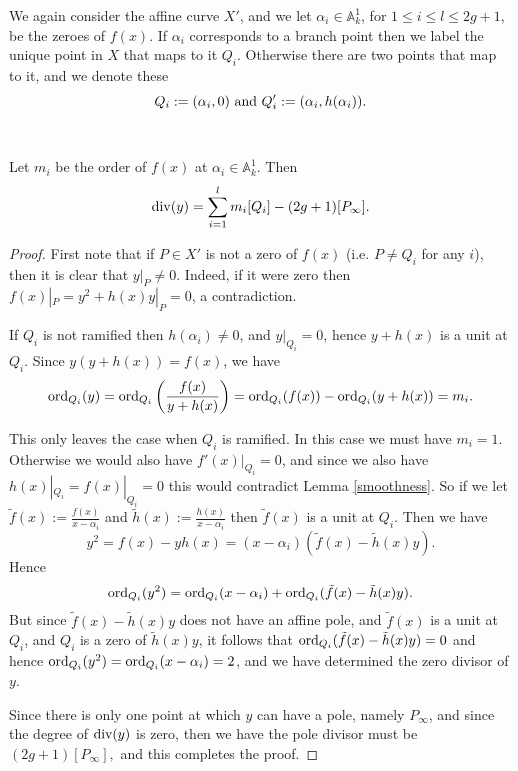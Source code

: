 We again consider the affine curve $X'$, and we let $\alpha_i \in \mathbb A_k^1$, for $1\leq i\leq l \leq 2g+1$, be the zeroes of $f(x)$.
If $\alpha_i$ corresponds to a branch point then we label the unique point in $X$ that maps to it $Q_i$.
Otherwise there are two points that map to it, and we denote these \[ Q_i:=(\alpha_i,0)\ {\rm and}\ Q_i':=(\alpha_i,h(\alpha_i)).\]


~


\begin{lem}\label{ychar2}
 Let $m_i$ be the order of $f(x)$ at $\alpha_i\in \mathbb A_k^1$.
 Then 
 \[
  \operatorname{div}(y) = \sum_{i=1}^l m_i[Q_i] - (2g+1)[P_\infty].
 \]

\end{lem}
\begin{proof}
 First note that if $P\in X'$ is not a zero of $f(x)$ (i.e. $P\neq Q_i$ for any $i$), then it is clear that $y|_P \neq 0$.
 Indeed, if it were zero then $f(x)|_P = y^2 + h(x)y|_P = 0$, a contradiction.
 
 If $Q_i$ is not ramified then $h(\alpha_i) \neq 0$, and $y|_{Q_i} = 0$, hence $y+h(x)$ is a unit at $Q_i$.
 Since $y(y+h(x)) = f(x)$, we have
 \[
  \operatorname{ord}_{Q_i}(y) = \operatorname{ord}_{Q_i}\left(\frac{f(x)}{y+h(x)}\right) = \operatorname{ord}_{Q_i}(f(x)) -\operatorname{ord}_{Q_i}(y+h(x)) = m_i.
 \]

 This only leaves the case when $Q_i$ is ramified. 
 In this case we must have $m_i=1$.
 Otherwise we would also have $f'(x)|_{Q_i} = 0$, and since we also have $h(x)|_{Q_i} = f(x)|_{Q_i} = 0$ this would contradict Lemma \ref{smoothness}.
 So if we let $\tilde f(x) := \frac{f(x)}{x-\alpha_i}$ and $\tilde h(x) := \frac{h(x)}{x-\alpha_i}$ then $\tilde f(x)$ is a unit at $Q_i$.
 Then we have \[y^2 = f(x) - yh(x) = (x-\alpha_i)(\tilde f(x) - \tilde h(x)y).\]
 Hence
 \[
  \operatorname{ord}_{Q_i}(y^2) = \operatorname{ord}_{Q_i}(x-\alpha_i) + \operatorname{ord}_{Q_i}(\tilde f(x) - \tilde h(x)y).
 \]
But since $\tilde f(x) - \tilde h(x) y$ does not have an affine pole, and $\tilde f(x)$ is a unit at $Q_i$, and $Q_i$ is a zero of $\tilde h(x) y$, it follows that $\operatorname{ord}_{Q_i}(\tilde f(x) -  \tilde h(x) y) = 0$
and hence $\operatorname{ord}_{Q_i}(y^2) = \operatorname{ord}_{Q_i}(x-\alpha_i) = 2$, and we have determined the zero divisor of $y$.

Since there is only one point at which $y$ can have a pole, namely $P_\infty$, and since the degree of $\operatorname{div} (y)$ is zero, then we have the pole divisor must be
$
 (2g+1)[P_\infty],
$
and this completes the proof.
\end{proof}



